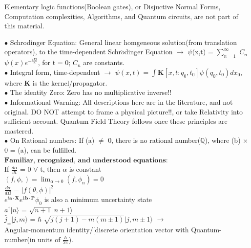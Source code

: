 \documentclass[10pt,fancy]{elegantbook}
\begin{document}
\begin{note}

Elementary logic functions(Boolean gates), or Disjuctive Normal Forms, Computation complexities, Algorithms, and Quantum circuits, are not part of this material.

$\bullet$ Schrodinger Equation: General linear homgeneous solution(from translation operators), to the time-dependent Schr$\ddot{o}$dinger Equation $\longrightarrow$ $\psi$(x,t) = $\sum_{n = 1}^\infty$ $C_n$ $\psi(x) e^{- \frac{i E t}{\hbar}}$, for t = 0; $C_n$ are constants.  \\  
         
$\bullet$ Integral form, time-dependent $\longrightarrow$ $\psi(x,t)$ = $\int \mathbf K[x,t:q_0,t_0]\psi(q_0,t_0)dx_0$, where  
$\mathbf K$ is the kernel/propagator. \\

$\bullet$ The identity Zero: Zero has no multiplicative inverse!!  \\

$\bullet$ Informational Warning: All descriptions here are in the literature, and not original. DO NOT attempt to frame a physical picture!!, or take Relativity into sufficient account. Quantum Field Theory follows once these principles are mastered. \\

$\bullet$ On Rational numbers: If (a) $\neq$ 0, there is no rational number($\mathbb Q$), where (b) $\times$ 0 = (a), can be fulfilled. \\


$\mathbf{\textbf{Familiar, recognized, and understood equations:}}$  \\

If $ \frac{d \alpha} {dt} $ = 0 $\forall$ t, then $\alpha$ is constant \\
 
$(f,\phi,) = \lim_{\alpha \to 0} (f, \phi_n) = 0 $ \\
 
$\frac{d \sigma} {d \Omega}$ = $|f(\theta, \phi)|^2$  \\

$ e^{i \mathbf a \cdot \mathbf X} e^{1 \mathbf b \cdot \mathbf P} \phi_0$ is also a minimum uncertainty state  \\

$a^\dagger |n \rangle$ = $\sqrt{n + 1} |n +1 \rangle$  \\
  
${\hat j_\pm} |j,m \rangle$ = $\hbar$ $\sqrt{j(j + 1) - m(m \pm 1)} |j, m \pm 1 \rangle$ $\longrightarrow$  \\
Angular-momentum identity/[discrete orientation vector with Quantum-number(in units of $\frac{\hbar}{2\pi}$).  \\
  

\end{note}
\end{document}
